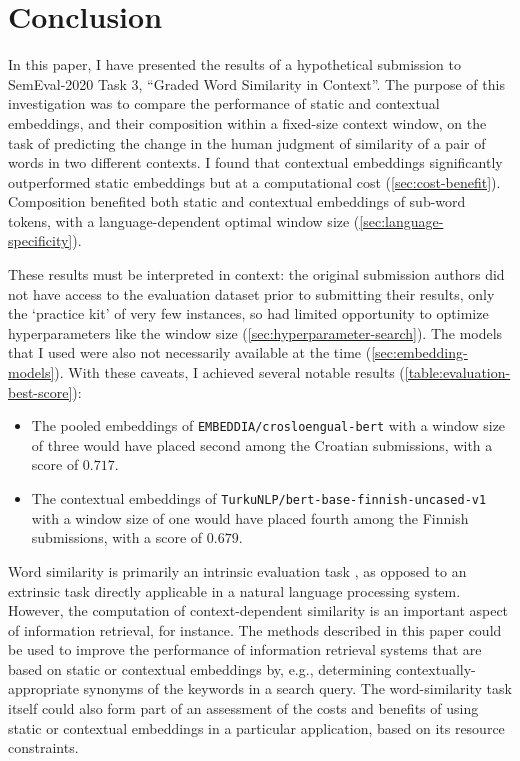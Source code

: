 \section{Conclusion}
\label{sec:conclusion}

In this paper, I have presented the results of a hypothetical submission to
SemEval-2020 Task 3, ``Graded Word Similarity in Context''.
The purpose of this investigation was to compare the performance of static and
contextual embeddings, and their composition within a fixed-size context window, on the
task of predicting the change in the human judgment of similarity of a pair of words in
two different contexts.
I found that contextual embeddings significantly outperformed static embeddings but at
a computational cost (\cref{sec:cost-benefit}).
Composition benefited both static and contextual embeddings of sub-word tokens, with a
language-dependent optimal window size (\cref{sec:language-specificity}).

These results must be interpreted in context: the original submission authors did not
have access to the evaluation dataset prior to submitting their results, only the
`practice kit' of very few instances, so had limited opportunity to optimize
hyperparameters like the window size (\cref{sec:hyperparameter-search}).
The models that I used were also not necessarily available at the time
(\cref{sec:embedding-models}).
With these caveats, I achieved several notable results (\cref{table:evaluation-best-score}):
\begin{itemize}
  \item The pooled embeddings of \texttt{EMBEDDIA/crosloengual-bert} with a window
        size of three would have placed second among the Croatian submissions, with a
        score of $0.717$.
  \item The contextual embeddings of \texttt{TurkuNLP/bert-base-finnish-uncased-v1}
        with a window size of one would have placed fourth among the Finnish
        submissions, with a score of $0.679$.
\end{itemize}

Word similarity is primarily an intrinsic evaluation task \parencite[1281]{Lenci2022},
as opposed to an extrinsic task directly applicable in a natural language processing
system.
However, the computation of context-dependent similarity is an important aspect of
information retrieval, for instance.
The methods described in this paper could be used to improve the performance of
information retrieval systems that are based on static or contextual embeddings by,
e.g., determining contextually-appropriate synonyms of the keywords in a search query.
The word-similarity task itself could also form part of an assessment of the costs and
benefits of using static or contextual embeddings in a particular application, based on
its resource constraints.
